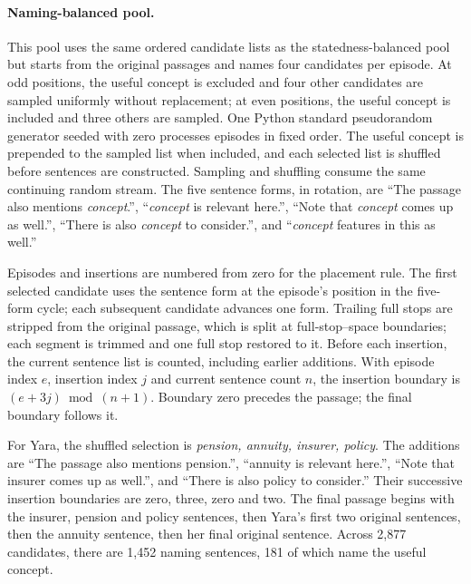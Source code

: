 \paragraph{Naming-balanced pool.}
\label{app:namingpool}
This pool uses the same ordered candidate lists as the
statedness-balanced pool but starts from the original passages and
names four candidates per episode. At odd positions, the useful concept
is excluded and four other candidates are sampled uniformly without
replacement; at even positions, the useful concept is included and
three others are sampled. One Python standard pseudorandom generator
seeded with zero processes episodes in fixed order. The useful concept
is prepended to the sampled list when included, and each selected list
is shuffled before sentences are constructed. Sampling and shuffling
consume the same continuing random stream. The five sentence forms, in
rotation, are ``The passage also mentions \emph{concept}.'',
``\emph{concept} is relevant here.'', ``Note that \emph{concept} comes up
as well.'', ``There is also \emph{concept} to consider.'', and
``\emph{concept} features in this as well.''

Episodes and insertions are numbered from zero for the placement rule.
The first selected candidate uses the sentence form at the episode's
position in the five-form cycle; each subsequent candidate advances
one form. Trailing full stops are stripped from the original passage,
which is split at full-stop--space boundaries; each segment is trimmed
and one full stop restored to it. Before each insertion, the current
sentence list is counted, including earlier additions. With episode
index $e$, insertion index $j$ and current sentence count $n$, the
insertion boundary is $(e+3j)\bmod(n+1)$. Boundary zero precedes the
passage; the final boundary follows it.

For Yara, the shuffled selection is \emph{pension, annuity, insurer,
policy}. The additions are ``The passage also mentions pension.'',
``annuity is relevant here.'', ``Note that insurer comes up as well.'',
and ``There is also policy to consider.'' Their successive insertion
boundaries are zero, three, zero and two. The final passage begins with
the insurer, pension and policy sentences, then Yara's first two original
sentences, then the annuity sentence, then her final original sentence.
Across 2,877 candidates, there are 1,452 naming sentences, 181 of which
name the useful concept.

